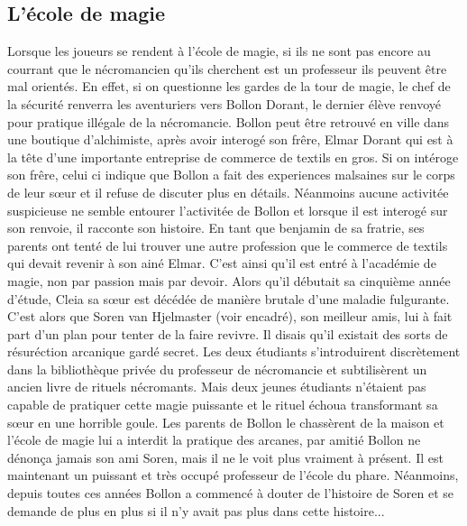 

\subsection{L'école de magie}
\label{TAS-Magie}

Lorsque les joueurs se rendent à l'école de magie, si ils ne sont pas encore au courrant que le nécromancien
qu'ils cherchent est un professeur ils peuvent être mal orientés. En effet, si on questionne les gardes de
la tour de magie, le chef de la sécurité renverra les aventuriers vers Bollon Dorant, le dernier élève 
renvoyé 
pour pratique illégale de la nécromancie. Bollon peut être retrouvé en ville dans une boutique d'alchimiste,
après avoir interogé son frêre, Elmar Dorant qui est à la tête d'une importante
entreprise de commerce de textils en gros. Si on intéroge son frêre, celui ci indique que Bollon a fait des 
experiences malsaines sur le corps de leur s\oe{}ur et il refuse de discuter plus en détails. Néanmoins 
aucune activitée suspicieuse ne semble entourer l'activitée de Bollon et 
lorsque il est interogé sur son renvoie, il racconte son histoire. En tant que benjamin de sa fratrie, ses
parents ont tenté de lui trouver une autre profession que le commerce de textils qui devait revenir à son 
ainé Elmar. C'est ainsi qu'il est entré à l'académie de magie, non par passion mais par devoir. Alors qu'il
débutait sa cinquième année d'étude, Cleia sa s\oe{}ur est décédée de manière brutale d'une maladie 
fulgurante. C'est alors que Soren van Hjelmaster (voir encadré), son meilleur 
amis, lui à fait part d'un plan pour
tenter de la faire revivre. Il disais qu'il existait des sorts de résuréction arcanique gardé secret. Les
deux étudiants s'introduirent discrètement dans la bibliothèque privée du professeur de nécromancie et 
subtilisèrent un ancien livre de rituels nécromants. Mais deux jeunes étudiants n'étaient pas capable
de pratiquer cette magie puissante et le rituel échoua transformant sa s\oe{}ur en une horrible goule. 
Les parents de Bollon le chassèrent de la maison et l'école de magie lui a interdit la pratique des
arcanes, par amitié Bollon ne dénonça jamais son ami Soren, mais il ne le voit plus vraiment à présent.
Il est maintenant un puissant et très occupé professeur de l'école du phare. Néanmoins, depuis toutes 
ces années Bollon
a commencé à douter de l'histoire de Soren et se demande de plus en plus si il n'y avait pas plus dans 
cette histoire...

